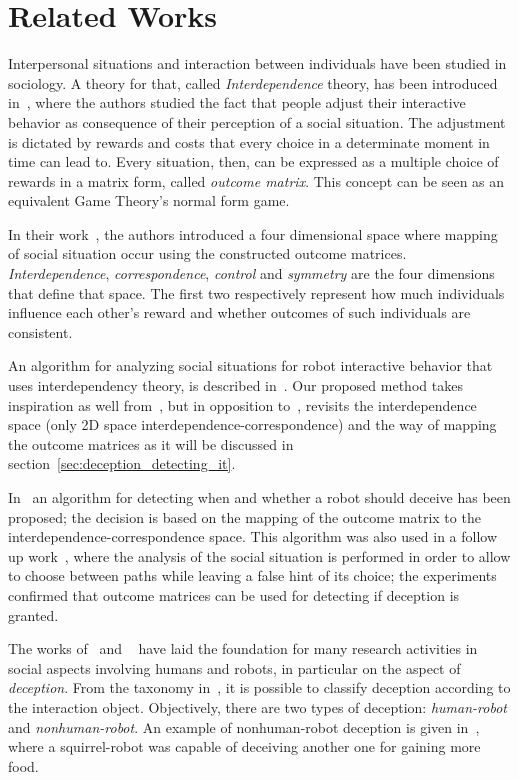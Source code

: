 \section{Related Works}\label{sec:deception_related_works}

Interpersonal situations and interaction between individuals have been studied in sociology. A theory for that, called \textit{Interdependence} theory, has been introduced in~\cite{kelley_interpersonal_1978}, where the authors studied the fact that people adjust their interactive behavior as consequence of their perception of a social situation. The adjustment is dictated by rewards and costs that every choice in a determinate moment in time can lead to. Every situation, then, can be expressed as a multiple choice of rewards in a matrix form, called \textit{outcome matrix}. This concept can be seen as an equivalent Game Theory's normal form game. 

In their work~\citep{kelley_interpersonal_1978}, the authors introduced a four dimensional space where mapping of social situation occur using the constructed outcome matrices. \textit{Interdependence}, \textit{correspondence}, \textit{control} and \textit{symmetry} are the four dimensions that define that space. The first two respectively represent how much individuals influence each other's reward and whether outcomes of such individuals are consistent. 

An algorithm for analyzing social situations for robot interactive behavior that uses interdependency theory, is described in~\cite{wagner_analyzing_2008}. Our proposed method takes inspiration as well from~\cite{kelley_interpersonal_1978}, but in opposition to~\cite{wagner_analyzing_2008}, revisits the interdependence space (only 2D space interdependence-correspondence) and the way of mapping the outcome matrices as it will be discussed in section~\ref{sec:deception_detecting_it}.

In~\cite{wagner_robot_2009} an algorithm for detecting when and whether a robot should deceive has been proposed; the decision is based on the mapping of the outcome matrix to the interdependence-correspondence space. This algorithm was also used in a follow up work~\cite{wagner_acting_2011}, where the analysis of the social situation is performed in order to allow to choose between paths while leaving a false hint of its choice; the experiments confirmed that outcome matrices can be used for detecting if deception is granted.

The works of~\cite{kelley_interpersonal_1978} and ~\cite{wagner_analyzing_2008, wagner_acting_2011, wagner_robot_2009} have laid the foundation for many research activities in social aspects involving humans and robots, in particular on the aspect of \textit{deception}. From the taxonomy in~\cite{shim_taxonomy_2013}, it is possible to classify deception according to the interaction object. Objectively, there are two types of deception: \textit{human-robot} and \textit{nonhuman-robot}. An example of nonhuman-robot deception is given in~\cite{shim_biologically-inspired_2012}, where a squirrel-robot was capable of deceiving another one for gaining more food. 

